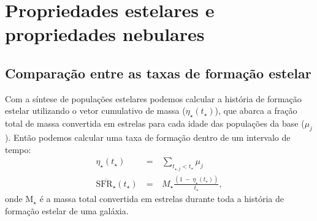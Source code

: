


\chapter{Propriedades estelares e propriedades nebulares}
\label{sec:synvsneb}

\section{Comparação entre as taxas de formação estelar}
\label{sec:synvsneb:SFR}

Com a síntese de populações estelares podemos calcular a história de formação estelar utilizando o
vetor cumulativo de massa ($\eta_\star(t_\star)$), que abarca a fração total de massa convertida em
estrelas para cada idade das populações da base ($\mu_j$). Então podemos calcular uma taxa de
formação dentro de um intervalo de tempo:
\begin{eqnarray}
	\eta_\star(t_\star)\ &=&\ \sum\limits_{t_{\star,j} < t_\star} \mu_j \\
	\overline{\mathrm{SFR}_\star}(t_\star)\ &=&\ M_\star \frac{(1\ -\ \eta_\star(t_\star))}{t_\star},
\end{eqnarray}
\noindent onde M${}_\star$ é a massa total convertida em estrelas durante toda a história de
formação estelar de uma galáxia. 

